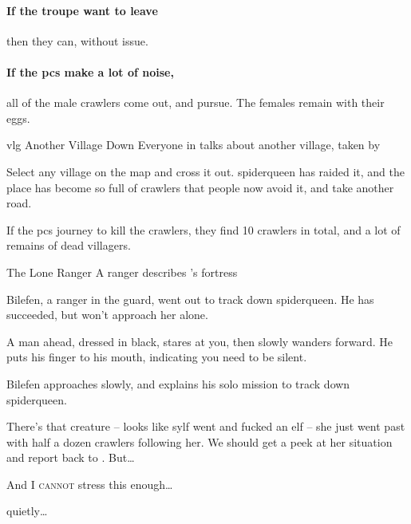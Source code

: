 \paragraph{If the troupe want to leave}
then they can, without issue.

\paragraph{If the \glspl{pc} make a lot of noise,}
all of the male \glspl{crawler} come out, and pursue.
The females remain with their eggs.



{\gls{vlg} Another Village Down}%
{Everyone in  talks about another village, taken by }%

Select any village on the map and cross it out.
\Gls{spiderqueen} has raided it, and the place has become so full of \glspl{crawler} that people now avoid it, and take another road.

If the \glspl{pc} journey to kill the \glspl{crawler}, they find 10 \glspl{crawler} in total, and a lot of remains of dead villagers.

{The Lone Ranger}%
{A  ranger describes 's fortress}%

Bilefen, a ranger in the \gls{guard}, went out to track down \gls{spiderqueen}.
He has succeeded, but won't approach her alone.

\begin{boxtext}
  A man ahead, dressed in black, stares at you, then slowly wanders forward.
  He puts his finger to his mouth, indicating you need to be silent.
\end{boxtext}

Bilefen approaches slowly, and explains his solo mission to track down \gls{spiderqueen}.

\begin{speechtext}
  \small
  There's that creature -- looks like \gls{sylf} went and fucked an elf -- she just went past with half a dozen \glspl{crawler} following her.
  We should get a peek at her situation and report back to .
  But\ldots

  And I {\large\scshape cannot} stress this enough\ldots

  \noindent
  quietly\ldots
\end{speechtext}

